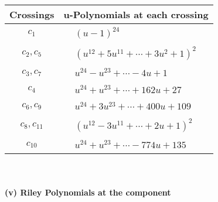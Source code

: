\documentclass[1p]{elsarticle_modified}
\theoremstyle{definition}
\begin{document}
\begin{tabular}{m{50pt}|m{274pt}}
Crossings & \hspace{64pt}u-Polynomials at each crossing \\
\hline $$\begin{aligned}c_{1}\end{aligned}$$&$\begin{aligned}
&(u-1)^{24}
\end{aligned}$\\
\hline $$\begin{aligned}c_{2},c_{5}\end{aligned}$$&$\begin{aligned}
&(u^{12}+5 u^{11}+\cdots+3 u^2+1)^{2}
\end{aligned}$\\
\hline $$\begin{aligned}c_{3},c_{7}\end{aligned}$$&$\begin{aligned}
&u^{24}- u^{23}+\cdots-4 u+1
\end{aligned}$\\
\hline $$\begin{aligned}c_{4}\end{aligned}$$&$\begin{aligned}
&u^{24}+u^{23}+\cdots+162 u+27
\end{aligned}$\\
\hline $$\begin{aligned}c_{6},c_{9}\end{aligned}$$&$\begin{aligned}
&u^{24}+3 u^{23}+\cdots+400 u+109
\end{aligned}$\\
\hline $$\begin{aligned}c_{8},c_{11}\end{aligned}$$&$\begin{aligned}
&(u^{12}-3 u^{11}+\cdots+2 u+1)^{2}
\end{aligned}$\\
\hline $$\begin{aligned}c_{10}\end{aligned}$$&$\begin{aligned}
&u^{24}+u^{23}+\cdots-774 u+135
\end{aligned}$\\
\hline
\end{tabular}\\~\\
\newpage\renewcommand{\arraystretch}{1}
\flushleft \textbf{(v) Riley Polynomials at the component}\newline \\
\end{document}
